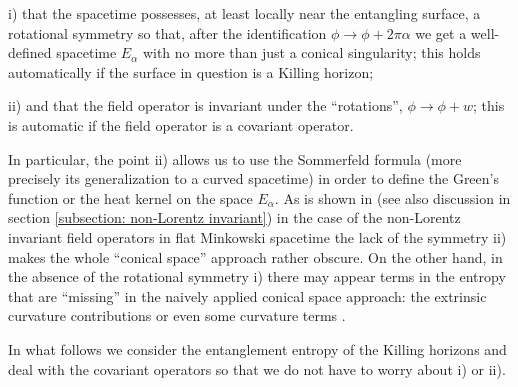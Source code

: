 \documentclass[12pt]{article}
\begin{document}
\medskip

\noindent i) that  the spacetime possesses, at least locally near the entangling surface, a rotational symmetry so that, after the identification $\phi\rightarrow \phi+2\pi\alpha$
we get a well-defined spacetime $E_\alpha$ with no more than just a conical singularity; this holds automatically  if the surface in question is a Killing horizon;

\medskip

\noindent ii) and that the field operator is invariant under the ``rotations'', $\phi\rightarrow \phi +w$; this is automatic if the field operator is a covariant operator. 

\medskip

In particular, the point ii) allows us to use the Sommerfeld formula (more precisely its generalization to a curved spacetime) in order to define the Green's function or the heat kernel 
on the space $E_\alpha$. 
As is shown in \cite{Nesterov:2010yi} (see also discussion in section  \ref{subsection: non-Lorentz invariant}) in the case of the non-Lorentz invariant field operators in flat Minkowski spacetime   the lack of the symmetry ii) makes the whole ``conical space'' approach rather obscure.  On the other hand, in the absence of the rotational symmetry i) 
there may appear terms in the entropy that are ``missing'' in the  naively applied conical space approach: the extrinsic curvature contributions \cite{Solodukhin:2008dh} or even  some curvature terms \cite{Hung:2011xb}.

In what  follows we consider  the entanglement entropy  of the Killing horizons and deal with the covariant operators so that we do not have to worry about i) or ii).
\end{document}
